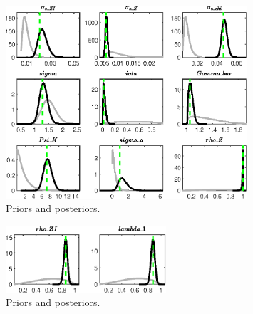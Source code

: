  
\begin{figure}[H]
\centering
\includegraphics[width=0.80\textwidth]{two_sector_RBC_fixed_cost/Output/two_sector_RBC_fixed_cost_PriorsAndPosteriors1}
\caption{Priors and posteriors.}\label{Fig:PriorsAndPosteriors:1}
\end{figure}
 
\begin{figure}[H]
\centering
\includegraphics[width=0.53\textwidth]{two_sector_RBC_fixed_cost/Output/two_sector_RBC_fixed_cost_PriorsAndPosteriors2}
\caption{Priors and posteriors.}\label{Fig:PriorsAndPosteriors:2}
\end{figure}
 
